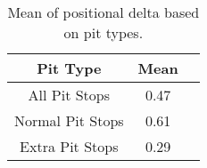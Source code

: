 \begin{table}
\centering
\caption{Mean of positional delta based on pit types.}
\label{tab:pos-points}
\begin{tabular}{ccc}
\toprule
         Pit Type &  Mean \\
\midrule
    All Pit Stops &  0.47 \\
 Normal Pit Stops &  0.61 \\
  Extra Pit Stops &  0.29 \\
\bottomrule
\end{tabular}
\end{table}
